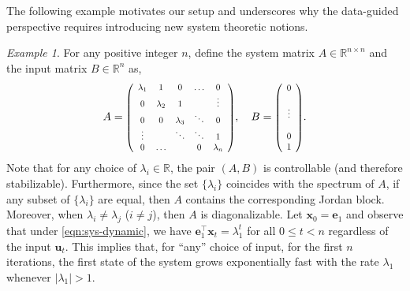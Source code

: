\documentclass[journal]{IEEEtran}
\theoremstyle{definition}
\theoremstyle{remark}
\newtheorem{example}{Example}
\newcommand\x{{\bm x}}
\def\u{{\bm u}}
\newcommand \e{{\bm e}}
\newcommand\scalemath[2]{\scalebox{#1}{\mbox{\ensuremath{\displaystyle #2}}}}
\begin{document}
    The following example motivates our setup and underscores why the data-guided perspective requires introducing new system theoretic notions.
	\begin{example}
		\label{ex:motivateExample}
		For any positive integer $n$, define the system matrix $A \in \mathbb{R}^{n\times n}$ and the input matrix $B \in \mathbb{R}^{n}$ as,
		\begin{gather*}
		    A = \scalemath{0.8}{
		\left(
		\begin{array}{*5{c}}
		\lambda_1   & 1         &    0      &  \hdots   &     0     \\
		0           & \lambda_2 &    1      &           &  \vdots   \\
		0           & 0         & \lambda_3 &  \ddots   &     0     \\
		\vdots      &           &  \ddots   &  \ddots   &     1     \\
		0           &  \hdots   &           &     0     & \lambda_n \\
		\end{array}
		\right)}, \quad 
		B = \scalemath{0.8}{\left(
		\begin{array}{*1{c}}
		0\\
		~\\
		\vdots\\
		~\\
		0\\
		1
		\end{array}\right)}.
		\end{gather*}
		Note that for any choice of $\lambda_i\in\mathbb{R}$, the pair $(A,B)$ is controllable (and therefore stabilizable).
		Furthermore, since the set $\{\lambda_i\}$ coincides with the spectrum of $A$, if any subset of $\{\lambda_i\}$ are equal, then $A$ contains the corresponding Jordan block.
		Moreover, when $\lambda_i\neq \lambda_j$ ($i\neq j$), then $A$ is diagonalizable.
		Let $\x_0 = \e_1$ and observe that under \eqref{eqn:sys-dynamic}, we have $\e_1^\intercal \x_t = \lambda_1^t$ for all $0 \leq t < n$ regardless of the input $\u_t$.
		This implies that, for ``any'' choice of input, for the first $n$ iterations, the first state of the system grows exponentially fast with the rate $\lambda_1$ whenever $|\lambda_1|> 1$.
	\end{example}{}
\end{document}

